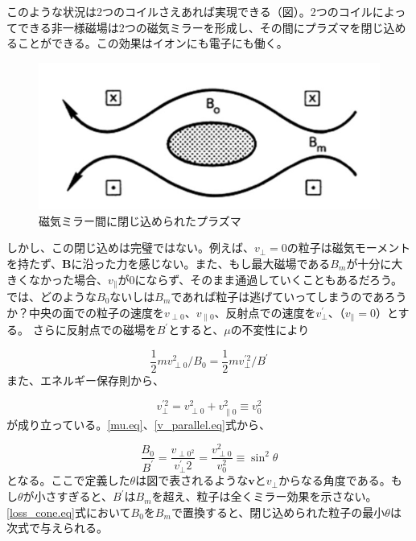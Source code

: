 \documentclass{ltjsarticle}
\numberwithin{equation}{section} %
\begin{document}
このような状況は2つのコイルさえあれば実現できる（図）。2つのコイルによってできる非一様磁場は2つの磁気ミラーを形成し、その間にプラズマを閉じ込めることができる。この効果はイオンにも電子にも働く。

\begin{figure}[htbp]
  \centering
  \includegraphics[width=0.7\linewidth]{trapped.png}
  \caption{磁気ミラー間に閉じ込められたプラズマ}
  \label{fig.trap}
\end{figure}

しかし、この閉じ込めは完璧ではない。例えば、$v_\perp=0$の粒子は磁気モーメントを持たず、$\bm{B}$に沿った力を感じない。また、もし最大磁場である$B_m$が十分に大きくなかった場合、$v_\parallel$が0にならず、そのまま通過していくこともあるだろう。
では、どのような$B_0$ないしは$B_m$であれば粒子は逃げていってしまうのであろうか？中央の面での粒子の速度を$v_{\perp 0}$、$v_{\parallel 0}$、反射点での速度を$v_\perp ^\prime$、（$v_\parallel =0$）とする。
さらに反射点での磁場を$B^\prime$とすると、$\mu$の不変性により

\begin{equation}
  \frac{1}{2}mv_{\perp 0} ^2 /B_0 = \frac{1}{2}mv_\perp ^{\prime 2}/B^\prime \label{mu.eq}
\end{equation}
また、エネルギー保存則から、

\begin{equation}
  v_\perp ^{\prime 2} = v_{\perp 0}^2 + v_{\parallel 0}^2 \equiv v_0 ^2 \label{v_parallel.eq}
\end{equation}
が成り立っている。\eqref{mu.eq}、\eqref{v_parallel.eq}式から、

\begin{equation}
  \frac{B_0}{B^\prime} = \frac{v_{\perp 0 ^2}}{v_\perp ^\prime 2} = \frac{v_{\perp0}^2}{v_0 ^2} \equiv \sin^2\theta \label{loss_cone.eq}
\end{equation}
となる。ここで定義した$\theta$は図で表されるような$\bm{v}$と$v_\perp$からなる角度である。もし$\theta$が小さすぎると、$B^\prime$は$B_m$を超え、粒子は全くミラー効果を示さない。
\eqref{loss_cone.eq}式において$B_0$を$B_m$で置換すると、閉じ込められた粒子の最小$\theta$は次式で与えられる。
\end{document}
